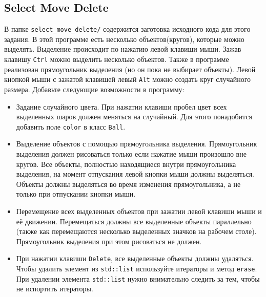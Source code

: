 \documentclass{article}
\begin{document}
\subsection{Select Move Delete}
 В папке \texttt{select\_move\_delete/} содержится заготовка исходного кода для этого задания. В этой программе есть несколько объектов(кругов), которые можно выделять. Выделение происходит по нажатию левой клавиши мыши. Зажав клавишу \texttt{Ctrl} можно выделить несколько объектов. Также в программе реализован прямоугольник выделения (но он пока не выбирает объекты). Левой кнопкой мыши с зажатой клавишей левый \texttt{Alt} можно создать круг случайного размера. Добавьте следующие возможности в программу:
\begin{itemize}
\item Задание случайного цвета. При нажатии клавиши пробел цвет всех выделенных шаров должен меняться на случайный. Для этого понадобится добавить поле \texttt{color} в класс \texttt{Ball}.

\item Выделение объектов с помощью прямоугольника выделения. Прямоугольник выделения должен рисоваться только если нажатие мыши произошло вне кругов. Все объекты, полностью находящиеся внутри прямоугольника выделения, на момент отпускания левой кнопки мыши должны выделяться. Объекты должны выделяться во время изменения прямоугольника, а не только при отпускании кнопки мыши.

\item Перемещение всех выделенных объектов при зажатии левой клавиши мыши и её движении. Перемещаться должны все выделенные объекты параллельно (также как перемещаются несколько выделенных значков на рабочем столе). Прямоугольник выделения при этом рисоваться не должен.

\item При нажатии клавиши \texttt{Delete}, все выделенные объекты должны удаляться. Чтобы удалить элемент из \texttt{std::list} используйте итераторы и метод \texttt{erase}. При удалении элемента \texttt{std::list} нужно внимательно следить за тем, чтобы не испортить итераторы.


\end{itemize}
\end{document}
